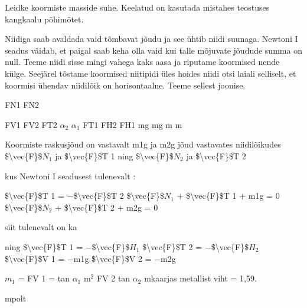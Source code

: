 
Leidke koormiste masside suhe. Keelatud on kasutada mistahes teostuses kangkaalu põhimõtet.

\hint

\solu
Niidiga saab avaldada vaid tõmbavat jõudu ja see ühtib niidi suunaga. Newtoni I seadus väidab, et paigal saab keha olla vaid kui talle mõjuvate jõudude summa on null. Teeme niidi sisse mingi vahega kaks aasa ja riputame koormised nende külge. Seejärel tõstame koormised niitipidi üles hoides niidi otsi laiali selliselt, et koormisi ühendav niidilõik on horisontaalne. Teeme sellest joonise.

FN1 FN2

FV1 FV2 FT2 $\alpha_2$ $\alpha_1$ FT1 FH2 FH1 mg mg m m

Koormiste raskusjõud on vastavalt m1g ja m2g jõud vastavates niidilõikudes \$\textbackslash{}vec\{F\}\$$N_1$ ja \$\textbackslash{}vec\{F\}\$T 1 ning \$\textbackslash{}vec\{F\}\$$N_2$ ja \$\textbackslash{}vec\{F\}\$T 2

kus Newtoni I seadusest tulenevalt :

\$\textbackslash{}vec\{F\}\$T 1 = $-$\$\textbackslash{}vec\{F\}\$T 2 \$\textbackslash{}vec\{F\}\$$N_1$ + \$\textbackslash{}vec\{F\}\$T 1 + m1g = 0 \$\textbackslash{}vec\{F\}\$$N_2$ + \$\textbackslash{}vec\{F\}\$T 2 + m2g = 0

siit tulenevalt on ka

ning \$\textbackslash{}vec\{F\}\$T 1 = $-$\$\textbackslash{}vec\{F\}\$$H_1$ \$\textbackslash{}vec\{F\}\$T 2 = $-$\$\textbackslash{}vec\{F\}\$$H_2$ \$\textbackslash{}vec\{F\}\$V 1 = $-$m1g \$\textbackslash{}vec\{F\}\$V 2 = $-$m2g

$m_1$ = FV 1 = tan $\alpha_1$ m$^2$ FV 2 tan $\alpha_2$ mkaarjas metallist viht = 1,59.

mpolt
\probend
